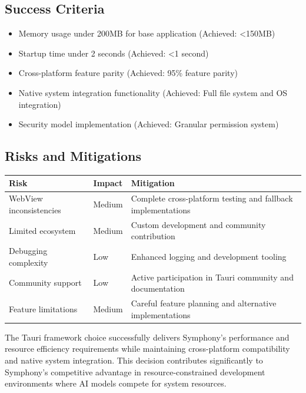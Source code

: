 \subsection*{Success Criteria}

\begin{itemize}
\item Memory usage under 200MB for base application (Achieved: <150MB)
\item Startup time under 2 seconds (Achieved: <1 second)
\item Cross-platform feature parity (Achieved: 95\% feature parity)
\item Native system integration functionality (Achieved: Full file system and OS integration)
\item Security model implementation (Achieved: Granular permission system)
\end{itemize}

\subsection*{Risks and Mitigations}

\begin{center}
\begin{tabular}{@{}p{4cm}p{2cm}p{6cm}@{}}
\toprule
\textbf{Risk} & \textbf{Impact} & \textbf{Mitigation} \\
\midrule
WebView inconsistencies & Medium & Complete cross-platform testing and fallback implementations \\
Limited ecosystem & Medium & Custom development and community contribution \\
Debugging complexity & Low & Enhanced logging and development tooling \\
Community support & Low & Active participation in Tauri community and documentation \\
Feature limitations & Medium & Careful feature planning and alternative implementations \\
\bottomrule
\end{tabular}
\end{center}

The Tauri framework choice successfully delivers Symphony's performance and resource efficiency requirements while maintaining cross-platform compatibility and native system integration. This decision contributes significantly to Symphony's competitive advantage in resource-constrained development environments where AI models compete for system resources.
